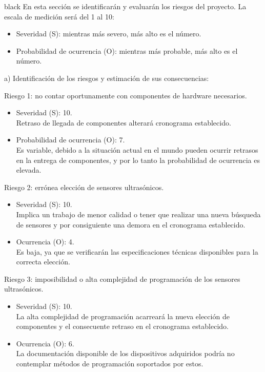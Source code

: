 \documentclass[
11pt, %
codirector, %
]{charter}
\begin{document}
\begin{consigna}{black}
En esta sección se identificarán y evaluarán los riesgos del proyecto. La escala de medición será del 1 al 10:
\begin{itemize}
	\item Severidad (S): mientras más severo, más alto es el número.\\
	\item Probabilidad de ocurrencia (O): mientras más probable, más alto es el número.\\
\end{itemize}   


a) Identificación de los riesgos y estimación de sus consecuencias:
 
Riesgo 1: no contar oportunamente con componentes de hardware necesarios.
\begin{itemize}
	\item Severidad (S): 10. \\
	Retraso de llegada de componentes alterará cronograma establecido.
	\item Probabilidad de ocurrencia (O): 7. \\
	Es variable, debido a la situación actual en el mundo pueden ocurrir retrasos en la entrega de componentes, y por lo tanto la probabilidad de ocurrencia es elevada.
\end{itemize}   

Riesgo 2: errónea elección de sensores ultrasónicos.
\begin{itemize}
	\item Severidad (S): 10. \\
	Implica un trabajo de menor calidad o tener que realizar una nueva búsqueda de sensores y por consiguiente una demora en el cronograma establecido.
	\item Ocurrencia (O): 4. \\
	Es baja, ya que se verificarán las especificaciones técnicas disponibles para la correcta elección.
\end{itemize}

Riesgo 3: imposibilidad o alta complejidad de programación de los sensores ultrasónicos.
\begin{itemize}
	\item Severidad (S): 10. \\
	La alta complejidad de programación acarreará la nueva elección de componentes y el consecuente retraso en el cronograma establecido.
	\item Ocurrencia (O): 6. \\
	La documentación disponible de los dispositivos adquiridos podría no contemplar métodos de programación soportados por estos.
\end{itemize}


\end{consigna}
\end{document}
